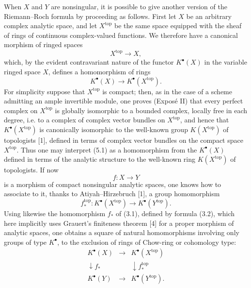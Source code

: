 When $X$ and $Y$ are nonsingular, it is possible to give another version of the Riemann--Roch formula by proceeding as follows. First let $X$ be an arbitrary complex analytic space, and let $X^{\mathrm{top}}$ be the same space equipped with the sheaf of rings of continuous complex-valued functions. We therefore have a canonical morphism of ringed spaces
\[
X^{\mathrm{top}}\longrightarrow X,
\]
which, by the evident contravariant nature of the functor $K^\bullet(X)$ in the variable ringed space $X$, defines a homomorphism of rings
\begin{equation}\tag{5.1}
K^\bullet(X)\longrightarrow K^\bullet(X^{\mathrm{top}}).
\end{equation}
For simplicity suppose that $X^{\mathrm{top}}$ is compact; then, as in the case of a scheme admitting an ample invertible module, one proves (Expos\'e II) that every perfect complex on $X^{\mathrm{top}}$ is globally isomorphic to a bounded complex, locally free in each degree, i.e. to a complex of complex vector bundles on $X^{\mathrm{top}}$, and hence that $K^\bullet(X^{\mathrm{top}})$ is canonically isomorphic to the well-known group $K(X^{\mathrm{top}})$ of topologists [1], defined in terms of complex vector bundles on the compact space $X^{\mathrm{top}}$. Thus one may interpret (5.1) as a homomorphism from the $K^\bullet(X)$ defined in terms of the analytic structure to the well-known ring $K(X^{\mathrm{top}})$ of topologists. If now
\[
f:X\longrightarrow Y
\]
is a morphism of compact nonsingular analytic spaces, one knows how to associate to it, thanks to Atiyah--Hirzebruch [1], a group homomorphism
\begin{equation}\tag{5.2}
f^{\mathrm{top}}_*:K^\bullet(X^{\mathrm{top}})\longrightarrow K^\bullet(Y^{\mathrm{top}}).
\end{equation}
Using likewise the homomorphism $f_*$ of (3.1), defined by formula (3.2), which here implicitly uses Grauert's finiteness theorem [4] for a proper morphism of analytic spaces, one obtains a square of natural homomorphisms involving only groups of type $K^\bullet$, to the exclusion of rings of Chow-ring or cohomology type:
\begin{equation}\tag{5.3}
\begin{array}{ccc}
K^\bullet(X) & \longrightarrow & K^\bullet(X^{\mathrm{top}}) \\
\downarrow f_* && \downarrow f^{\mathrm{top}}_* \\
K^\bullet(Y) & \longrightarrow & K^\bullet(Y^{\mathrm{top}}).
\end{array}
\end{equation}
